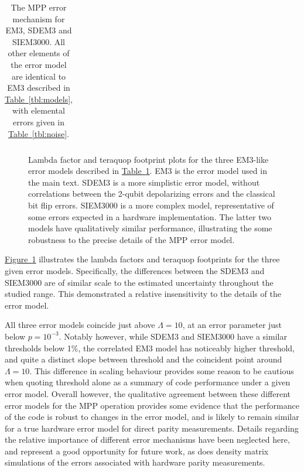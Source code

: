 \documentclass[onecolumn,unpublished,a4paper]{quantumarticle}
\theoremstyle{definition}
\theoremstyle{definition}
\theoremstyle{definition}
\newcommand{\fig}[1]{\hyperref[fig:#1]{Figure~\ref*{fig:#1}}}
\newcommand{\tbl}[1]{\hyperref[tbl:#1]{Table~\ref*{tbl:#1}}}
\begin{document}
\begin{table}[h]
{\begin{tabular}{|r|l|}
    \end{tabular}
    }
    \caption{
        The MPP error mechanism for EM3, SDEM3 and SIEM3000.
        All other elements of the error model are identical to EM3 described in \tbl{models}, with elemental errors given in \tbl{noise}.
    }
    \label{tbl:em3_mpp_noises}
\end{table}

\begin{figure}
    \centering
    \caption{
        Lambda factor and teraquop footprint plots for the three EM3-like error models described in \tbl{em3_mpp_noises}. EM3 is the error model used in the main text. SDEM3 is a more simplistic error model, without correlations between the 2-qubit depolarizing errors and the classical bit flip errors. SIEM3000 is a more complex model, representative of some errors expected in a hardware implementation. The latter two models have qualitatively similar performance, illustrating the some robustness to the precise details of the MPP error model.
    }
    \label{fig:em_comparison}
\end{figure}

\fig{em_comparison} illustrates the lambda factors and teraquop footprints for the three given error models. Specifically, the differences between the SDEM3 and SIEM3000 are of similar scale to the estimated uncertainty throughout the studied range. This demonstrated a relative insensitivity to the details of the error model.

All three error models coincide just above $\Lambda=10$, at an error parameter just below $p=10^{-3}$. Notably however, while SDEM3 and SIEM3000 have a similar thresholds below 1\%, the correlated EM3 model has noticeably higher threshold, and quite a distinct slope between threshold and the coincident point around $\Lambda=10$. This difference in scaling behaviour provides some reason to be cautious when quoting threshold alone as a summary of code performance under a given error model. Overall however, the qualitative agreement between these different error models for the MPP operation provides some evidence that the performance of the code is robust to changes in the error model, and is likely to remain similar for a true hardware error model for direct parity measurements. Details regarding the relative importance of different error mechanisms have been neglected here, and represent a good opportunity for future work, as does density matrix simulations of the errors associated with hardware parity measurements. 
\end{document}
